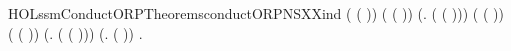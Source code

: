 \begin{SaveVerbatim}{HOLssmConductORPTheoremsconductORPNSXXind}
       ( ( )) \HOLSymConst{\HOLTokenConj{}}
       ( ( )) \HOLSymConst{\HOLTokenConj{}}
     (\HOLSymConst{\HOLTokenForall{}}.   ( ( ))) \HOLSymConst{\HOLTokenConj{}}
       ( ( )) \HOLSymConst{\HOLTokenConj{}}
       ( ( )) \HOLSymConst{\HOLTokenConj{}}
     (\HOLSymConst{\HOLTokenForall{}}.   ( ( ))) \HOLSymConst{\HOLTokenConj{}}
     (\HOLSymConst{\HOLTokenForall{}}.   ( )) \HOLSymConst{\HOLTokenImp{}}
     \HOLSymConst{\HOLTokenForall{}} .   
\end{SaveVerbatim}
\newcommand{\HOLssmConductORPTheoremsconductORPNSXXind}{\UseVerbatim{HOLssmConductORPTheoremsconductORPNSXXind}}
